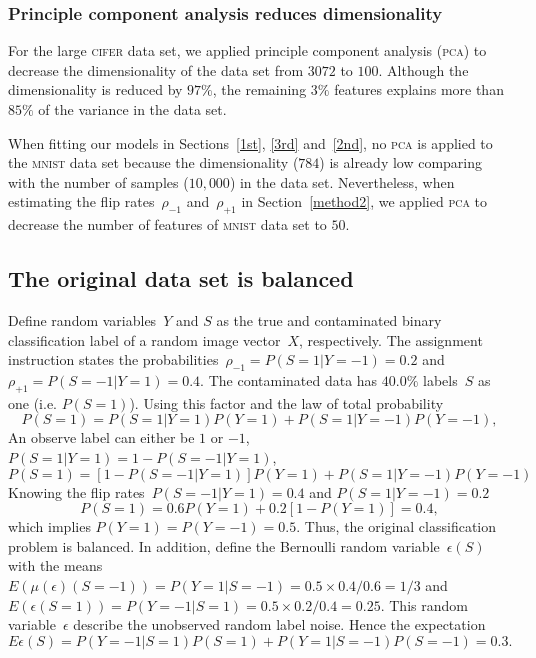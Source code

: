 \documentclass[12pt]{article} %
\newcommand{\rhoo}{\rho_{+1}}
\newcommand{\rhoz}{\rho_{-1}}
\begin{document}
\subsubsection{Principle component analysis reduces dimensionality}
For the large \textsc{cifer} data set, we applied principle component analysis (\textsc{pca}) to decrease the dimensionality of the data set from $3072$ to $100$. Although the dimensionality is reduced by $97\%$, the remaining $3\%$ features explains more than $85\%$ of the variance in the data set. 

When fitting our models in Sections~\ref{1st}, \ref{3rd} and~\ref{2nd}, no \textsc{pca} is applied to the \textsc{mnist} data set because the dimensionality ($784$) is already low comparing with the number of samples ($10,000$) in the data set. Nevertheless, when estimating the flip rates~$\rhoz$ and~$\rhoo$ in Section~\ref{method2}, we applied \textsc{pca} to decrease the number of features of \textsc{mnist} data set to $50$.

\subsection{The original data set is balanced} \label{sec:1}
Define random variables~$Y$ and $S$ as the true and contaminated binary classification label of a random image vector~$X$, respectively. The assignment instruction states the probabilities~$\rhoz=P(S=1|Y=-1)=0.2$ and $\rhoo=P(S=-1|Y=1)=0.4$.
The contaminated data has $40.0\%$ labels~$S$ as one (i.e. $P(S=1)$). Using this factor and the law of total probability
\begin{equation*}
P(S=1)=P(S=1|Y=1)P(Y=1)+P(S=1|Y=-1)P(Y=-1),
\end{equation*}
An observe label can either be $1$ or $-1$, $P(S=1|Y=1)=1-P(S=-1|Y=1)$,
\begin{equation*}
P(S=1)=\left[1-P(S=-1|Y=1)\right]P(Y=1)+P(S=1|Y=-1)P(Y=-1)
\end{equation*}
Knowing the flip rates~$P(S=-1|Y=1)=0.4$ and $P(S=1|Y=-1)=0.2$
\begin{equation}
P(S=1)=0.6P(Y=1)+0.2\left[1-P(Y=1)\right]=0.4, \label{eq:ps}
\end{equation}
which implies $P(Y=1)=P(Y=-1)=0.5$. Thus, the original classification problem is balanced. 
In addition, define the Bernoulli random variable~$\epsilon(S)$ with the means $E(\mu(\epsilon)(S=-1))=P(Y=1|S=-1)=0.5\times0.4/0.6=1/3$ and $E(\epsilon(S=1))=P(Y=-1|S=1)=0.5\times0.2/0.4=0.25$. This random variable~$\epsilon$ describe the unobserved random label noise. Hence the expectation
\begin{equation}
    E\epsilon(S)=P(Y=-1|S=1)P(S=1)+P(Y=1|S=-1)P(S=-1)
    =0.3.\label{eq:exp}
\end{equation}
\end{document}
